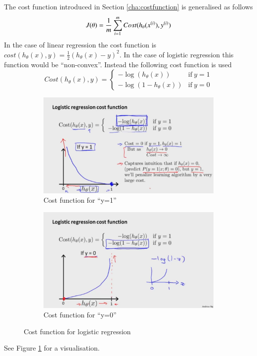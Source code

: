 \documentclass[a4paper,twoside,10pt]{article}
\begin{document}
The cost function introduced in Section \ref{cha:costfunction} is generalised as follows
\begin{equation*}
  J(\theta)=\frac{1}{m}\displaystyle\sum_{i=1}^m Cost(h_\theta(x^{(i)}),y^{(i)})
\end{equation*}
In the case of linear regression the cost function is $cost(h_\theta(x),y)=\frac{1}{2}(h_\theta(x)-y)^2$.
In the case of logistic regression this function would be ``non-convex''. Instead the following cost function is used
\begin{equation*}
Cost(h_\theta(x),y)=
\left\{\begin{array}{rl}-\operatorname{log}(h_\theta(x))&\mathrm{if\ }y=1\\
-\operatorname{log}(1-h_\theta(x))&\mathrm{if\ }y=0\end{array}\right.
\end{equation*}
\begin{figure}[htbp]
  \begin{center}
    \begin{subfigure}[b]{.47\textwidth}
      \includegraphics[width=\linewidth]{costy1}
      \caption{Cost function for ``y=1''}
    \end{subfigure}
    \begin{subfigure}[b]{.47\textwidth}
      \includegraphics[width=\linewidth]{costy0}
      \caption{Cost function for ``y=0''}
    \end{subfigure}
    \caption{Cost function for logistic regression\citep{andrewng}\label{fig:costlog}}
  \end{center}
\end{figure}
See Figure \ref{fig:costlog} for a visualisation.
\end{document}
